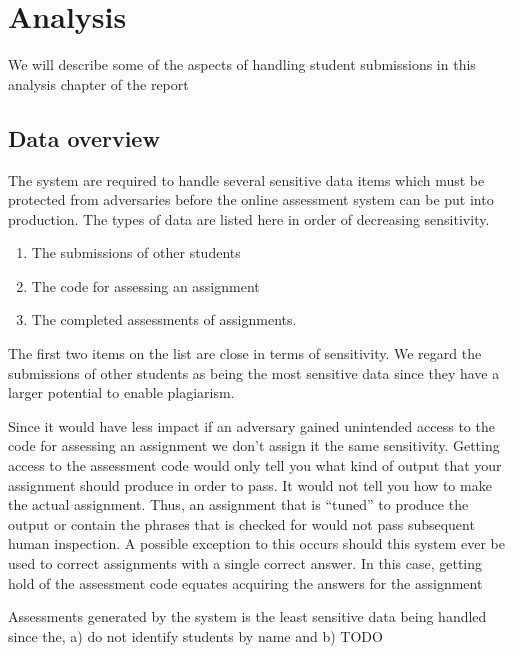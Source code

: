 \chapter{Analysis}
We will describe some of the aspects of handling student submissions
in this analysis chapter of the report

\section{Data overview}

The system are required to handle  several sensitive data items which must be
protected from adversaries before the online assessment system can be
put into production. The types of data are listed here in order of
decreasing sensitivity.

\begin{enumerate}
  \item The submissions of other students
  \item The code for assessing an assignment
  \item The completed assessments of assignments.
\end{enumerate}

The first two items on the list are close in terms of
sensitivity. We regard the submissions of other students as being the
most sensitive data since they have a larger potential to enable
plagiarism.

Since it would have less impact if an adversary gained unintended access
to the code for assessing an assignment we don't assign it the same
sensitivity. Getting access to the assessment code would only tell you
what kind of output that your assignment should produce in order to
pass. It would not tell you how to make the actual assignment. Thus,
an assignment that is "`tuned"' to produce the output or contain the
phrases that is checked for would not pass subsequent human
inspection. A possible exception to this occurs should this system
ever be used to correct assignments with a single correct answer. In
this case, getting hold of the assessment code equates acquiring the
answers for the assignment


Assessments generated by the system is the least sensitive data being
handled since the, a) do not identify students by name  and b)
TODO

